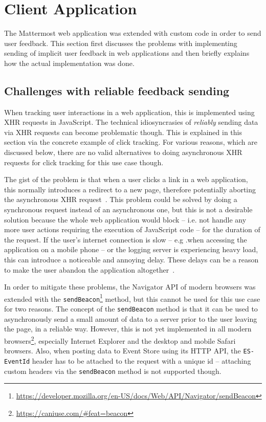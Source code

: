 \section{Client Application}
\label{sec:implementation:client}

The Mattermost web application was extended with custom code in order to send user feedback.
This section first discusses the problems with implementing sending of implicit user feedback in web applications and then briefly explains how the actual implementation was done.

\subsection{Challenges with reliable feedback sending}
\label{subsec:implementation:client:problems}

When tracking user interactions in a web application, this is implemented using \ac{XHR} requests in JavaScript.
The technical idiosyncrasies of \emph{reliably} sending data via \ac{XHR} requests can become problematic though.
This is explained in this section via the concrete example of click tracking.
For various reasons, which are discussed below, there are no valid alternatives to doing asynchronous \ac{XHR} requests for click tracking for this use case though.

The gist of the problem is that when a user clicks a link in a web application, this normally introduces a redirect to a new page, therefore potentially aborting the asynchronous \ac{XHR} request~\cite{Kohavi2010}.
This problem could be solved by doing a synchronous request instead of an asynchronous one, but this is not a desirable solution because the whole web application would block -- i.e. not handle any more user actions requiring the execution of JavaScript code -- for the duration of the request.
If the user's internet connection is slow -- e.g .when accessing the application on a mobile phone -- or the logging server is experiencing heavy load, this can introduce a noticeable and annoying delay.
These delays can be a reason to make the user abandon the application altogether~\cite{Kohavi2010,Dmitriev2017}.

In order to mitigate these problems, the Navigator \ac{API} of modern browsers was extended with the \texttt{sendBeacon}\footnote{\url{https://developer.mozilla.org/en-US/docs/Web/API/Navigator/sendBeacon}} method, but this cannot be used for this use case for two reasons.
The concept of the \texttt{sendBeacon} method is that it can be used to asynchronously send a small amount of data to a server prior to the user leaving the page, in a reliable way.
However, this is not yet implemented in all modern browsers\footnote{\url{https://caniuse.com/\#feat=beacon}}, especially Internet Explorer and the desktop and mobile Safari browsers.
Also, when posting data to Event Store using its \ac{HTTP} \ac{API}, the \texttt{ES-EventId} header has to be attached to the request with a unique id -- attaching custom headers via the \texttt{sendBeacon} method is not supported though.

